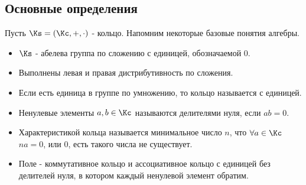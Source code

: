 \documentclass[unicode,10pt]{article}
\begin{document}
\subsection{Основные определения}
Пусть $\Ks=(\Kc,+,\cdot)$ - кольцо.
Напомним некоторые базовые понятия алгебры.
\begin{itemize}
  \item $\Ks$ - абелева группа по сложению с единицей, обозначаемой $0$.
  \item Выполнены левая и правая дистрибутивность по сложения.
  \item Если есть единица в группе по умножению, то кольцо называется с единицей.
  \item  Ненулевые элементы $a,b\in\Kc$ называются делителями нуля, если $ab=0$.
  \item
    \begin{df}
      Характеристикой кольца называется минимальное число $n$, что $\forall a\in\Kc$
      $na=0$, или $0$, есть такого числа не существует.
    \end{df}
    \item Поле - коммутативное кольцо и ассоциативное кольцо с единицей
      без делителей нуля, в котором каждый ненулевой элемент обратим.
\end{itemize}
\end{document}
